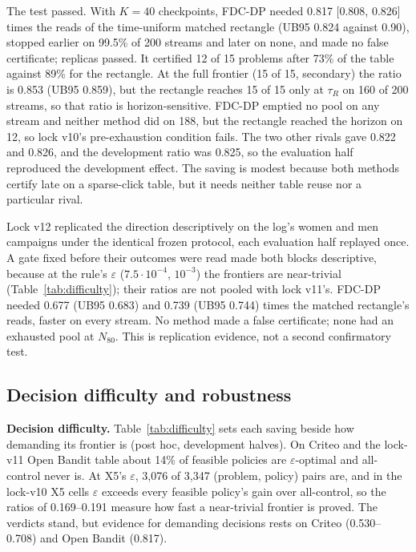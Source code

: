 \documentclass[sigconf,anonymous,review]{acmart}
\newcommand{\eps}{\varepsilon}
\begin{document}
The test passed. With $K = 40$ checkpoints, FDC-DP needed 0.817 [0.808, 0.826] times the reads of the time-uniform matched rectangle (UB95 0.824 against 0.90), stopped earlier on 99.5\% of 200 streams and later on none, and made no false certificate; replicas passed. It certified 12 of 15 problems after 73\% of the table against 89\% for the rectangle. At the full frontier (15 of 15, secondary) the ratio is 0.853 (UB95 0.859), but the rectangle reaches 15 of 15 only at $\tau_R$ on 160 of 200 streams, so that ratio is horizon-sensitive. FDC-DP emptied no pool on any stream and neither method did on 188, but the rectangle reached the horizon on 12, so lock v10's pre-exhaustion condition fails. The two other rivals gave 0.822 and 0.826, and the development ratio was 0.825, so the evaluation half reproduced the development effect. The saving is modest because both methods certify late on a sparse-click table, but it needs neither table reuse nor a particular rival.

Lock v12 replicated the direction descriptively on the log's women and men campaigns under the identical frozen protocol, each evaluation half replayed once. A gate fixed before their outcomes were read made both blocks descriptive, because at the rule's $\eps$ ($7.5 \cdot 10^{-4}$, $10^{-3}$) the frontiers are near-trivial (Table~\ref{tab:difficulty}); their ratios are not pooled with lock v11's. FDC-DP needed 0.677 (UB95 0.683) and 0.739 (UB95 0.744) times the matched rectangle's reads, faster on every stream. No method made a false certificate; none had an exhausted pool at $N_{80}$. This is replication evidence, not a second confirmatory test.

\subsection{Decision difficulty and robustness}\label{sec:external}

\textbf{Decision difficulty.} Table~\ref{tab:difficulty} sets each saving beside how demanding its frontier is (post hoc, development halves). On Criteo and the lock-v11 Open Bandit table about 14\% of feasible policies are $\eps$-optimal and all-control never is. At X5's $\eps$, 3,076 of 3,347 (problem, policy) pairs are, and in the lock-v10 X5 cells $\eps$ exceeds every feasible policy's gain over all-control, so the ratios of 0.169--0.191 measure how fast a near-trivial frontier is proved. The verdicts stand, but evidence for demanding decisions rests on Criteo (0.530--0.708) and Open Bandit (0.817).
\end{document}
